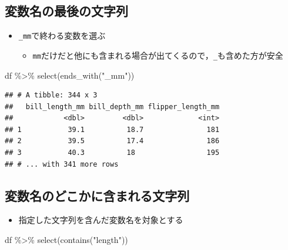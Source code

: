 \documentclass[
  xelatex,ja=standard, b5paper]{bxjsbook}
\newenvironment{Shaded}{\begin{snugshade}}{\end{snugshade}}
\newcommand{\FunctionTok}[1]{\textcolor[rgb]{0.00,0.00,0.00}{#1}}
\newcommand{\NormalTok}[1]{#1}
\newcommand{\SpecialCharTok}[1]{\textcolor[rgb]{0.00,0.00,0.00}{#1}}
\newcommand{\StringTok}[1]{\textcolor[rgb]{0.31,0.60,0.02}{#1}}
\providecommand{\tightlist}{%
  \setlength{\itemsep}{0pt}\setlength{\parskip}{0pt}}
\begin{document}
\hypertarget{select-helper2}{%
\subsection{変数名の最後の文字列}\label{select-helper2}}

\begin{itemize}
\tightlist
\item
  \texttt{\_mm}で終わる変数を選ぶ

  \begin{itemize}
  \tightlist
  \item
    \texttt{mm}だけだと他にも含まれる場合が出てくるので，\texttt{\_}も含めた方が安全
  \end{itemize}
\end{itemize}

\begin{Shaded}
\begin{Highlighting}[]
\NormalTok{df }\SpecialCharTok{\%\textgreater{}\%}
  \FunctionTok{select}\NormalTok{(}\FunctionTok{ends\_with}\NormalTok{(}\StringTok{"\_mm"}\NormalTok{))}
\end{Highlighting}
\end{Shaded}

\begin{verbatim}
## # A tibble: 344 x 3
##   bill_length_mm bill_depth_mm flipper_length_mm
##            <dbl>         <dbl>             <int>
## 1           39.1          18.7               181
## 2           39.5          17.4               186
## 3           40.3          18                 195
## # ... with 341 more rows
\end{verbatim}

\hypertarget{select-helper3}{%
\subsection{変数名のどこかに含まれる文字列}\label{select-helper3}}

\begin{itemize}
\tightlist
\item
  指定した文字列を含んだ変数名を対象とする
\end{itemize}

\begin{Shaded}
\begin{Highlighting}[]
\NormalTok{df }\SpecialCharTok{\%\textgreater{}\%}
  \FunctionTok{select}\NormalTok{(}\FunctionTok{contains}\NormalTok{(}\StringTok{"length"}\NormalTok{))}
\end{Highlighting}
\end{Shaded}
\end{document}
